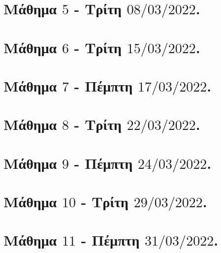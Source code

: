 \documentclass[oneside,a4paper]{article}
\begin{document}
\pagebreak


\section*{Μάθημα $5$ - Τρίτη $08/03/2022$.}
\vspace{0.3truecm}


\pagebreak


\section*{Μάθημα $6$ - Τρίτη $15/03/2022$.}
\vspace{0.3truecm}


\pagebreak


\section*{Μάθημα $7$ - Πέμπτη $17/03/2022$.}
\vspace{0.3truecm}


\pagebreak



\section*{Μάθημα $8$ - Τρίτη $22/03/2022$.}
\vspace{0.3truecm}


\pagebreak


\section*{Μάθημα $9$ - Πέμπτη $24/03/2022$.}
\vspace{0.3truecm}


\pagebreak


\section*{Μάθημα $10$ - Τρίτη $29/03/2022$.}
\vspace{0.3truecm}


\pagebreak

\section*{Μάθημα $11$ - Πέμπτη $31/03/2022$.}
\vspace{0.3truecm}

\end{document}
